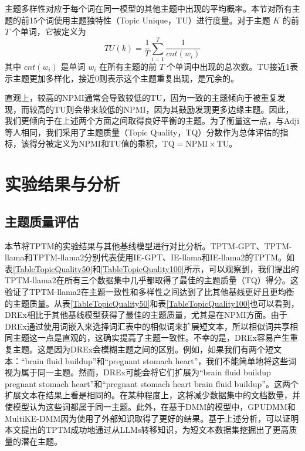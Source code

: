 主题多样性对应于每个词在同一模型的其他主题中出现的平均概率\cite{DVAE}。本节对所有主题的前15个词使用主题独特性（Topic Unique，TU）进行度量\cite{TU}。对于主题 $K$ 的前 $T$ 个单词，它被定义为
\begin{equation}
    TU(k) = \frac{1}{T}\sum_{i=1}^T\frac{1}{cnt(w_i)}
\end{equation}
其中 $cnt(w_i)$ 是单词 $w_i$ 在所有主题的前 $T$ 个单词中出现的总次数。TU接近1表示主题更加多样化，接近0则表示这个主题重复出现，是冗余的。

直观上，较高的NPMI通常会导致较低的TU，因为一致的主题倾向于被重复发现，而较高的TU则会带来较低的NPMI，因为其鼓励发现更多边缘主题\cite{NQTM}。因此，我们更倾向于在上述两个方面之间取得良好平衡的主题。为了衡量这一点，与Adji等人\cite{overallQuality,iclr/0003G0ZTCZ22}相同，我们采用了主题质量（Topic Quality，TQ）分数作为总体评估的指标，该得分被定义为NPMI和TU值的乘积，$\mbox{TQ}=\mbox{NPMI}\times \mbox{TU}$。%

\section{实验结果与分析}
\label{experiment_r}

\subsection{主题质量评估}
本节将TPTM的实验结果与其他基线模型进行对比分析。TPTM-GPT、TPTM-llama和TPTM-llama2分别代表使用IE-GPT、IE-llama和IE-llama2的TPTM。如表\ref{TableTopicQuality50}和\ref{TableTopicQuality100}所示，可以观察到，我们提出的TPTM-llama2在所有三个数据集中几乎都取得了最佳的主题质量（TQ）得分。这验证了TPTM-llama2在主题一致性和多样性之间达到了比其他基线更好且更均衡的主题质量。从表\ref{TableTopicQuality50}和表\ref{TableTopicQuality100}也可以看到，DREx相比于其他基线模型获得了最佳的主题质量，尤其是在NPMI方面。由于DREx通过使用词嵌入来选择词汇表中的相似词来扩展短文本，所以相似词共享相同主题这一点是直观的，这确实提高了主题一致性。不幸的是，DREx容易产生重复主题。这是因为DREx会模糊主题之间的区别。例如，如果我们有两个短文本：“brain fluid buildup”和“pregnant stomach heart”，我们不能简单地将这些词视为属于同一主题。然而，DREx可能会将它们扩展为“brain fluid buildup pregnant stomach heart”和“pregnant stomach heart brain fluid buildup”。这两个扩展文本在结果上看是相同的。在某种程度上，这将减少数据集中的文档数量，并使模型认为这些词都属于同一主题。此外，在基于DMM的模型中，GPUDMM和MultiKE-DMM因为使用了外部知识取得了更好的结果。基于上述分析，可以证明本文提出的TPTM成功地通过从LLMs转移知识，为短文本数据集挖掘出了更高质量的潜在主题。

